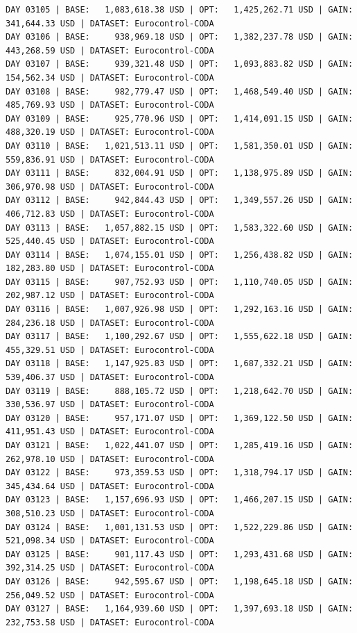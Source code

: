 \documentclass[11pt,a4paper]{article}
\begin{document}
\begin{verbatim}
DAY 03105 | BASE:   1,083,618.38 USD | OPT:   1,425,262.71 USD | GAIN: 341,644.33 USD | DATASET: Eurocontrol-CODA
DAY 03106 | BASE:     938,969.18 USD | OPT:   1,382,237.78 USD | GAIN: 443,268.59 USD | DATASET: Eurocontrol-CODA
DAY 03107 | BASE:     939,321.48 USD | OPT:   1,093,883.82 USD | GAIN: 154,562.34 USD | DATASET: Eurocontrol-CODA
DAY 03108 | BASE:     982,779.47 USD | OPT:   1,468,549.40 USD | GAIN: 485,769.93 USD | DATASET: Eurocontrol-CODA
DAY 03109 | BASE:     925,770.96 USD | OPT:   1,414,091.15 USD | GAIN: 488,320.19 USD | DATASET: Eurocontrol-CODA
DAY 03110 | BASE:   1,021,513.11 USD | OPT:   1,581,350.01 USD | GAIN: 559,836.91 USD | DATASET: Eurocontrol-CODA
DAY 03111 | BASE:     832,004.91 USD | OPT:   1,138,975.89 USD | GAIN: 306,970.98 USD | DATASET: Eurocontrol-CODA
DAY 03112 | BASE:     942,844.43 USD | OPT:   1,349,557.26 USD | GAIN: 406,712.83 USD | DATASET: Eurocontrol-CODA
DAY 03113 | BASE:   1,057,882.15 USD | OPT:   1,583,322.60 USD | GAIN: 525,440.45 USD | DATASET: Eurocontrol-CODA
DAY 03114 | BASE:   1,074,155.01 USD | OPT:   1,256,438.82 USD | GAIN: 182,283.80 USD | DATASET: Eurocontrol-CODA
DAY 03115 | BASE:     907,752.93 USD | OPT:   1,110,740.05 USD | GAIN: 202,987.12 USD | DATASET: Eurocontrol-CODA
DAY 03116 | BASE:   1,007,926.98 USD | OPT:   1,292,163.16 USD | GAIN: 284,236.18 USD | DATASET: Eurocontrol-CODA
DAY 03117 | BASE:   1,100,292.67 USD | OPT:   1,555,622.18 USD | GAIN: 455,329.51 USD | DATASET: Eurocontrol-CODA
DAY 03118 | BASE:   1,147,925.83 USD | OPT:   1,687,332.21 USD | GAIN: 539,406.37 USD | DATASET: Eurocontrol-CODA
DAY 03119 | BASE:     888,105.72 USD | OPT:   1,218,642.70 USD | GAIN: 330,536.97 USD | DATASET: Eurocontrol-CODA
DAY 03120 | BASE:     957,171.07 USD | OPT:   1,369,122.50 USD | GAIN: 411,951.43 USD | DATASET: Eurocontrol-CODA
DAY 03121 | BASE:   1,022,441.07 USD | OPT:   1,285,419.16 USD | GAIN: 262,978.10 USD | DATASET: Eurocontrol-CODA
DAY 03122 | BASE:     973,359.53 USD | OPT:   1,318,794.17 USD | GAIN: 345,434.64 USD | DATASET: Eurocontrol-CODA
DAY 03123 | BASE:   1,157,696.93 USD | OPT:   1,466,207.15 USD | GAIN: 308,510.23 USD | DATASET: Eurocontrol-CODA
DAY 03124 | BASE:   1,001,131.53 USD | OPT:   1,522,229.86 USD | GAIN: 521,098.34 USD | DATASET: Eurocontrol-CODA
DAY 03125 | BASE:     901,117.43 USD | OPT:   1,293,431.68 USD | GAIN: 392,314.25 USD | DATASET: Eurocontrol-CODA
DAY 03126 | BASE:     942,595.67 USD | OPT:   1,198,645.18 USD | GAIN: 256,049.52 USD | DATASET: Eurocontrol-CODA
DAY 03127 | BASE:   1,164,939.60 USD | OPT:   1,397,693.18 USD | GAIN: 232,753.58 USD | DATASET: Eurocontrol-CODA

\end{verbatim}
\end{document}
